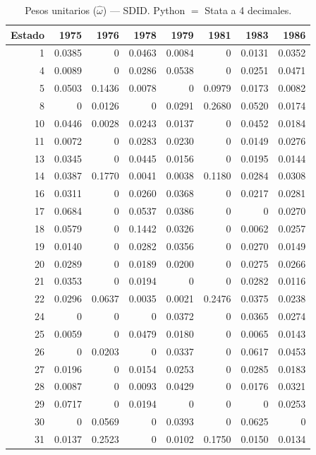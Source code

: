 \begin{table}[H]
\centering
\caption{Pesos unitarios ($\hat{\omega}$) --- SDID. Python $=$ Stata a 4 decimales.}
\label{tab:omega_sdid}
\small
\begin{tabular}{rrrrrrrr}
\toprule
Estado & 1975 & 1976 & 1978 & 1979 & 1981 & 1983 & 1986 \\
\midrule
1 & 0.0385 & 0 & 0.0463 & 0.0084 & 0 & 0.0131 & 0.0352 \\
4 & 0.0089 & 0 & 0.0286 & 0.0538 & 0 & 0.0251 & 0.0471 \\
5 & 0.0503 & 0.1436 & 0.0078 & 0 & 0.0979 & 0.0173 & 0.0082 \\
8 & 0 & 0.0126 & 0 & 0.0291 & 0.2680 & 0.0520 & 0.0174 \\
10 & 0.0446 & 0.0028 & 0.0243 & 0.0137 & 0 & 0.0452 & 0.0184 \\
11 & 0.0072 & 0 & 0.0283 & 0.0230 & 0 & 0.0149 & 0.0276 \\
13 & 0.0345 & 0 & 0.0445 & 0.0156 & 0 & 0.0195 & 0.0144 \\
14 & 0.0387 & 0.1770 & 0.0041 & 0.0038 & 0.1180 & 0.0284 & 0.0308 \\
16 & 0.0311 & 0 & 0.0260 & 0.0368 & 0 & 0.0217 & 0.0281 \\
17 & 0.0684 & 0 & 0.0537 & 0.0386 & 0 & 0 & 0.0270 \\
18 & 0.0579 & 0 & 0.1442 & 0.0326 & 0 & 0.0062 & 0.0257 \\
19 & 0.0140 & 0 & 0.0282 & 0.0356 & 0 & 0.0270 & 0.0149 \\
20 & 0.0289 & 0 & 0.0189 & 0.0200 & 0 & 0.0275 & 0.0266 \\
21 & 0.0353 & 0 & 0.0194 & 0 & 0 & 0.0282 & 0.0116 \\
22 & 0.0296 & 0.0637 & 0.0035 & 0.0021 & 0.2476 & 0.0375 & 0.0238 \\
24 & 0 & 0 & 0 & 0.0372 & 0 & 0.0365 & 0.0274 \\
25 & 0.0059 & 0 & 0.0479 & 0.0180 & 0 & 0.0065 & 0.0143 \\
26 & 0 & 0.0203 & 0 & 0.0337 & 0 & 0.0617 & 0.0453 \\
27 & 0.0196 & 0 & 0.0154 & 0.0253 & 0 & 0.0285 & 0.0183 \\
28 & 0.0087 & 0 & 0.0093 & 0.0429 & 0 & 0.0176 & 0.0321 \\
29 & 0.0717 & 0 & 0.0194 & 0 & 0 & 0 & 0.0253 \\
30 & 0 & 0.0569 & 0 & 0.0393 & 0 & 0.0625 & 0 \\
31 & 0.0137 & 0.2523 & 0 & 0.0102 & 0.1750 & 0.0150 & 0.0134 \\

\end{tabular}
\end{table}
